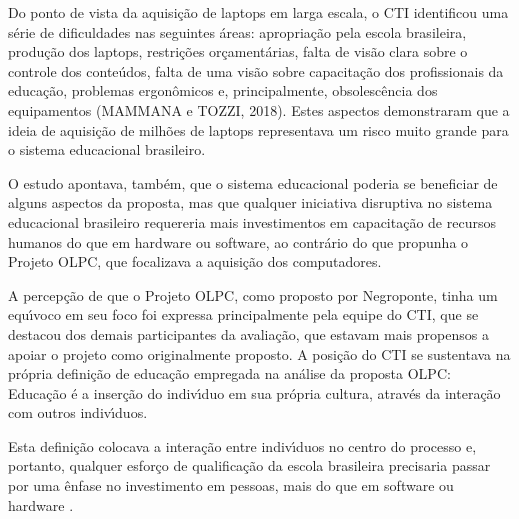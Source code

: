 \documentclass[
12pt,		%
openright,	%
twoside,  %
a4paper,			%
chapter=TITLE,		%
english,			%
french,				%
spanish,			%
brazil				%
]{USPSC-classe/USPSC}
\begin{document}
Do ponto de vista da aquisi\c{c}\~ao de \textquotedbl laptops \textquotedbl  em larga escala, o CTI identificou uma s\'erie de dificuldades nas seguintes \'areas: apropria\c{c}\~ao pela escola brasileira, produ\c{c}\~ao dos laptops, restri\c{c}\~oes or\c{c}ament\'arias, falta de vis\~ao clara sobre o controle dos conte\'udos, falta de uma vis\~ao sobre capacita\c{c}\~ao dos profissionais da educa\c{c}\~ao, problemas ergon\^omicos e, principalmente, obsolesc\^encia dos equipamentos (MAMMANA e TOZZI, 2018). Estes aspectos demonstraram que a ideia de aquisi\c{c}\~ao de milh\~oes de laptops representava um risco muito grande para o sistema educacional brasileiro.









O estudo apontava, tamb\'em, que o sistema educacional poderia se beneficiar de alguns aspectos da proposta, mas que qualquer iniciativa disruptiva no sistema educacional brasileiro requereria mais investimentos em capacita\c{c}\~ao de recursos humanos do que em hardware ou software, ao contr\'ario do que propunha o Projeto OLPC, que focalizava a aquisi\c{c}\~ao dos computadores.









A percep\c{c}\~ao de que o Projeto OLPC, como proposto por Negroponte, tinha um equ\'{\i}voco em seu foco foi expressa principalmente pela equipe do CTI, que se destacou dos demais participantes da avalia\c{c}\~ao, que estavam mais propensos a apoiar o projeto como originalmente proposto. A posi\c{c}\~ao do CTI se sustentava na pr\'opria defini\c{c}\~ao de educa\c{c}\~ao empregada na an\'alise da proposta OLPC: \textquotedbl Educa\c{c}\~ao \'e a inser\c{c}\~ao do indiv\'{\i}duo em sua pr\'opria cultura, atrav\'es da intera\c{c}\~ao com outros indiv\'{\i}duos\textquotedbl .









Esta defini\c{c}\~ao colocava a intera\c{c}\~ao entre indiv\'{\i}duos no centro do processo e, portanto, qualquer esfor\c{c}o de qualifica\c{c}\~ao da escola brasileira precisaria passar por uma \^enfase no investimento em \textquotedbl pessoas, mais do que em software ou hardware \textquotedbl .
\end{document}
